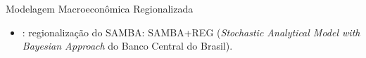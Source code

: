 \documentclass[presentation.tex]{subfiles}
\begin{document}

\begin{frame}{Modelagem Macroeconômica Regionalizada}
	
	\begin{itemize}
		
		\item \textcite{osterno_uma_2022}: regionalização do SAMBA: SAMBA+REG (\textit{Stochastic Analytical Model with Bayesian Approach} do Banco Central do Brasil).
				
	\end{itemize}
	
\end{frame}
\end{document}

